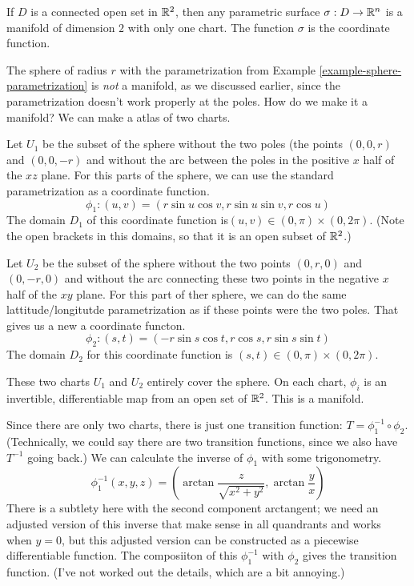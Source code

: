 \documentclass[fleqn,letterpaper]{report}
\begin{document}
\begin{example}
If $D$ is a connected open set in $\mathbb{R}^2$, then any parametric
surface $\sigma: D\rightarrow \mathbb{R}^n$ is a manifold of
dimension $2$ with only one chart. The function $\sigma$ is
the coordinate function.
\end{example}

\begin{example}
The sphere of radius $r$ with the parametrization from
Example \ref{example-sphere-parametrization} is \emph{not} a manifold,
as we discussed earlier, since the parametrization doesn't
work properly at the poles. How do we make it a manifold? We
can make a atlas of two charts.
\begin{smallitemize}
\item Let $U_1$ be the subset of the sphere without the two
poles (the points $(0,0,r)$ and $(0,0,-r)$ and without the arc
between the poles in the positive $x$ half of the $xz$ plane.
For this parts of the sphere, we can use the standard
parametrization as a coordinate function.
\begin{equation*}
\phi_1: (u,v) = (r\sin u \cos v, r\sin u \sin v, r\cos u)
\end{equation*}
The domain $D_1$ of this coordinate function is$(u,v) \in
(0,\pi) \times (0,2\pi)$. (Note the open brackets in this
domains, so that it is an open subset of $\mathbb{R}^2$.)
\item Let $U_2$ be the subset of the sphere without the two
points $(0,r,0)$ and $(0,-r,0)$ and without the arc connecting
these two points in the negative $x$ half of the $xy$ plane.
For this part of ther sphere, we can do the same
lattitude/longitutde parametrization as if these points were
the two poles. That gives us a new a coordinate functon.
\begin{equation*}
\phi_2: (s,t) = (-r\sin s \cos t, r\cos s , r\sin s \sin t)
\end{equation*}
The domain $D_2$ for this coordinate function is $(s,t) \in
(0,\pi) \times (0,2\pi)$.
\end{smallitemize}
These two charts $U_1$ and $U_2$ entirely cover the sphere. On
each chart, $\phi_i$ is an invertible, differentiable map from an
open set of $\mathbb{R}^2$. This is a manifold. 

Since there are only two charts, there is just one transition
function: $T = \phi_1^{-1} \circ \phi_2$. (Technically, we
could say there are two transition functions, since we also have
$T^{-1}$ going back.) We can calculate the inverse of
$\phi_1$ with some trigonometry. 
\begin{equation*}
\phi_1^{-1} (x,y,z) = \left( \arctan \frac{z}{\sqrt{x^2+y^2}},
\arctan \frac{y}{x} \right) 
\end{equation*}
There is a subtlety here with the second component
arctangent; we need an adjusted version of this inverse that
make sense in all quandrants and works when $y= 0$, but this
adjusted version can be constructed as a piecewise
differentiable function. The composiiton of this $\phi_1^{-1}$
with $\phi_2$ gives the transition function. (I've not worked
out the details, which are a bit annoying.)
\end{example}
\end{document}
